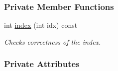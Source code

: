 \subsubsection*{Private Member Functions}
\begin{DoxyCompactItemize}
\item 
int \hyperlink{classSinoS_a4126d5ea5282461353ece36da73af13f}{index} (int idx) const 
\begin{DoxyCompactList}\small\item\em Checks correctness of the index. \item\end{DoxyCompactList}\end{DoxyCompactItemize}
\subsubsection*{Private Attributes}
